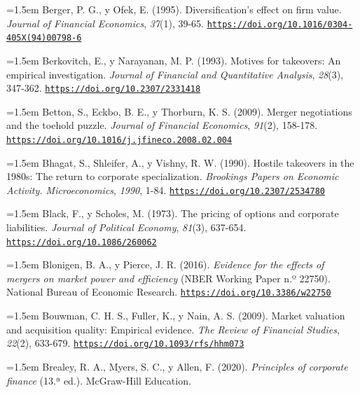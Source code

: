 \documentclass[10pt,a4paper]{article}
\begin{document}
\noindent\hangindent=1.5em Berger, P. G., y Ofek, E. (1995). Diversification's effect on firm value. \textit{Journal of Financial Economics}, \textit{37}(1), 39-65. \href{https://doi.org/10.1016/0304-405X(94)00798-6}{\nolinkurl{https://doi.org/10.1016/0304-405X(94)00798-6}}

\noindent\hangindent=1.5em Berkovitch, E., y Narayanan, M. P. (1993). Motives for takeovers: An empirical investigation. \textit{Journal of Financial and Quantitative Analysis}, \textit{28}(3), 347-362. \href{https://doi.org/10.2307/2331418}{\nolinkurl{https://doi.org/10.2307/2331418}}

\noindent\hangindent=1.5em Betton, S., Eckbo, B. E., y Thorburn, K. S. (2009). Merger negotiations and the toehold puzzle. \textit{Journal of Financial Economics}, \textit{91}(2), 158-178. \href{https://doi.org/10.1016/j.jfineco.2008.02.004}{\nolinkurl{https://doi.org/10.1016/j.jfineco.2008.02.004}}

\noindent\hangindent=1.5em Bhagat, S., Shleifer, A., y Vishny, R. W. (1990). Hostile takeovers in the 1980s: The return to corporate specialization. \textit{Brookings Papers on Economic Activity. Microeconomics}, \textit{1990}, 1-84. \href{https://doi.org/10.2307/2534780}{\nolinkurl{https://doi.org/10.2307/2534780}}

\noindent\hangindent=1.5em Black, F., y Scholes, M. (1973). The pricing of options and corporate liabilities. \textit{Journal of Political Economy}, \textit{81}(3), 637-654. \href{https://doi.org/10.1086/260062}{\nolinkurl{https://doi.org/10.1086/260062}}

\noindent\hangindent=1.5em Blonigen, B. A., y Pierce, J. R. (2016). \textit{Evidence for the effects of mergers on market power and efficiency} (NBER Working Paper n.º 22750). National Bureau of Economic Research. \href{https://doi.org/10.3386/w22750}{\nolinkurl{https://doi.org/10.3386/w22750}}

\noindent\hangindent=1.5em Bouwman, C. H. S., Fuller, K., y Nain, A. S. (2009). Market valuation and acquisition quality: Empirical evidence. \textit{The Review of Financial Studies}, \textit{22}(2), 633-679. \href{https://doi.org/10.1093/rfs/hhm073}{\nolinkurl{https://doi.org/10.1093/rfs/hhm073}}

\noindent\hangindent=1.5em Brealey, R. A., Myers, S. C., y Allen, F. (2020). \textit{Principles of corporate finance} (13.ª ed.). McGraw-Hill Education.
\end{document}
